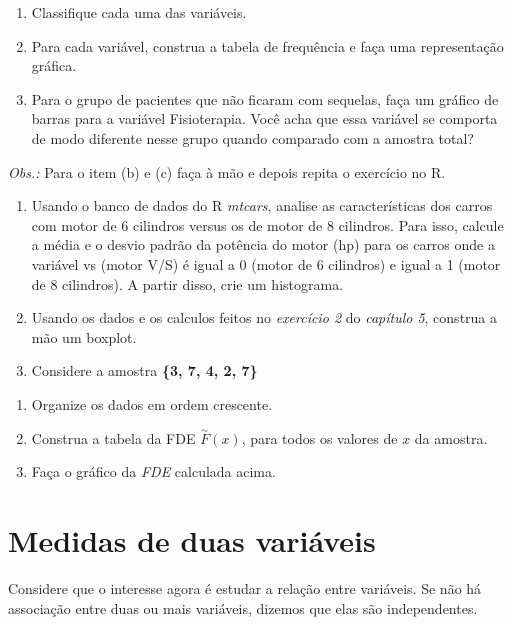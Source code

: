 \documentclass[
]{book}
\providecommand{\tightlist}{%
  \setlength{\itemsep}{0pt}\setlength{\parskip}{0pt}}
\begin{document}
\begin{enumerate}
\def\labelenumi{(\alph{enumi})}
\tightlist
\item
  Classifique cada uma das variáveis.
\item
  Para cada variável, construa a tabela de frequência e faça uma representação gráfica.
\item
  Para o grupo de pacientes que não ficaram com sequelas, faça um gráfico de barras para a variável Fisioterapia. Você acha que essa variável se comporta de modo diferente nesse grupo quando comparado com a amostra total?
\end{enumerate}

\emph{Obs.:} Para o item (b) e (c) faça à mão e depois repita o exercício no R.

\begin{enumerate}
\def\labelenumi{\arabic{enumi}.}
\setcounter{enumi}{1}
\item
  Usando o banco de dados do R \emph{mtcars}, analise as características dos carros com motor de 6 cilindros versus os de motor de 8 cilindros. Para isso, calcule a média e o desvio padrão da potência do motor (hp) para os carros onde a variável vs (motor V/S) é igual a 0 (motor de 6 cilindros) e igual a 1 (motor de 8 cilindros). A partir disso, crie um histograma.
\item
  Usando os dados e os calculos feitos no \emph{exercício 2} do \emph{capítulo 5}, construa a mão um boxplot.
\item
  Considere a amostra \textbf{\{3, 7, 4, 2, 7\}}
\end{enumerate}

\begin{enumerate}
\def\labelenumi{\alph{enumi})}
\tightlist
\item
  Organize os dados em ordem crescente.
\item
  Construa a tabela da FDE \(\overset{\sim}{F}(x)\), para todos os valores de \(x\) da amostra.
\item
  Faça o gráfico da \emph{FDE} calculada acima.
\end{enumerate}

\chapter{Medidas de duas variáveis}\label{medidas_duas_va}

Considere que o interesse agora é estudar a relação entre variáveis. Se não há associação entre duas ou mais variáveis, dizemos que elas são independentes.
\end{document}
